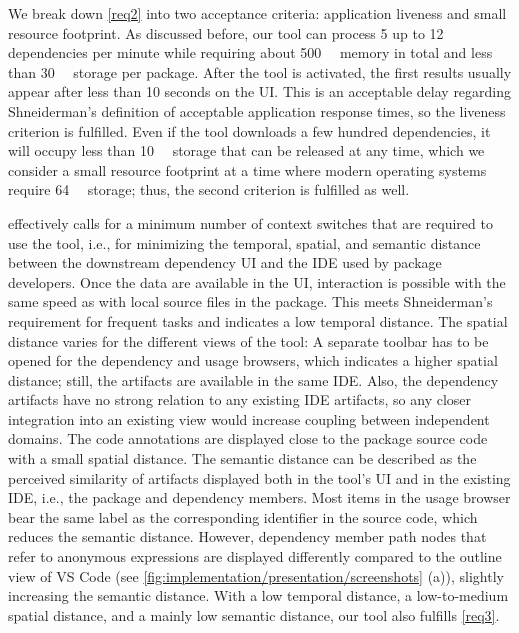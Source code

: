 \documentclass[a4paper,twoside]{article}
\begin{document}
We break down \cref{req2} into two acceptance criteria: application liveness and small resource footprint.
As discussed before, our tool can process 5 up to 12 dependencies per minute while requiring about \SI{500}{\mega\byte} memory in total and less than \SI{30}{\mega\byte} storage per package.
After the tool is activated, the first results usually appear after less than 10 seconds on the UI.
This is an acceptable delay regarding Shneiderman's definition of acceptable application response times, so the liveness criterion is fulfilled.
Even if the tool downloads a few hundred dependencies, it will occupy less than \SI{10}{\giga\byte} storage that can be released at any time, which we consider a small resource footprint at a time where modern operating systems require \SI{64}{\giga\byte} storage; thus, the second criterion is fulfilled as well.

 effectively calls for a minimum number of context switches that are required to use the tool, i.e., for minimizing the temporal, spatial, and semantic distance~\cite{ungar1997debugging} between the downstream dependency UI and the IDE used by package developers. 
Once the data are available in the UI, interaction is possible with the same speed as with local source files in the package.
This meets Shneiderman's requirement for frequent tasks and indicates a low temporal distance.
The spatial distance varies for the different views of the tool:
A separate toolbar has to be opened for the dependency and usage browsers, which indicates a higher spatial distance; still, the artifacts are available in the same IDE.
Also, the dependency artifacts have no strong relation to any existing IDE artifacts, so any closer integration into an existing view would increase coupling between independent domains.
The code annotations are displayed close to the package source code with a small spatial distance.
The semantic distance can be described as the perceived similarity of artifacts displayed both in the tool's UI and in the existing IDE, i.e., the package and dependency members.
Most items in the usage browser bear the same label as the corresponding identifier in the source code, which reduces the semantic distance.
However, dependency member path nodes that refer to anonymous expressions are displayed differently compared to the outline view of VS Code (see \cref{fig:implementation/presentation/screenshots} (a)), slightly increasing the semantic distance.
With a low temporal distance, a low-to-medium spatial distance, and a mainly low semantic distance, our tool also fulfills \cref{req3}.
\end{document}
